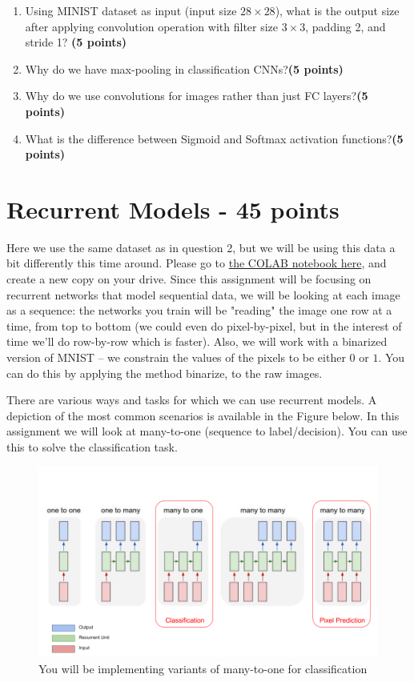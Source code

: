 \documentclass[12pt]{article}
\begin{document}
\begin{enumerate}[label=(\roman*)]
\item Using MINIST dataset as input (input size $28 \times 28$), what is the output size after applying convolution operation with filter size $3\times3$, padding 2, and stride 1? \textbf{(5 points)}
\item Why do we have max-pooling in classification CNNs?\textbf{(5 points)}
\item  Why do we use convolutions for images rather than
just FC layers?\textbf{(5 points)}
\item What is the difference between Sigmoid and Softmax activation functions?\textbf{(5 points)}
\end{enumerate}

\section{Recurrent Models - 45 points}
 Here we use the same dataset as in question 2, but we will be using this data a bit differently this time around. Please go to \href{https://colab.research.google.com/drive/1uuA3lPuVd3TgdDF0EVYCqanaPd5y-_oF?usp=sharing}{the COLAB notebook here}, and create a new copy on your drive. Since this assignment will be focusing on recurrent networks that model sequential data, we will be looking at each image as a sequence: the networks you train will be "reading" the image one row at a time, from top to bottom (we could even do pixel-by-pixel, but in the interest of time we'll do row-by-row which is faster). Also, we will work with a binarized version of MNIST -- we constrain the values of the pixels to be either $0$ or $1$. You can do this by applying the method binarize, to the raw images.

There are various ways and tasks for which we can use recurrent models. A depiction of the most common scenarios is available in the Figure below. In this assignment we will look at many-to-one (sequence to label/decision). You can use this to solve the classification task.

\begin{figure}
    \centering
    \includegraphics[width=\columnwidth]{images/str.png}
    \caption{You will be implementing variants of many-to-one for classification}
    \label{fig:my_label}
\end{figure}
\end{document}
